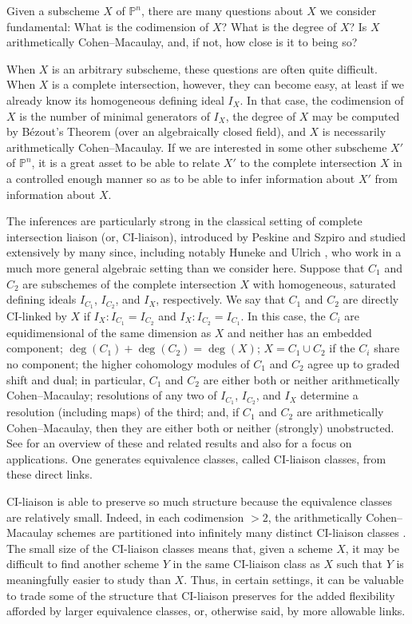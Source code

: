 \documentclass[12pt, reqno]{amsart}
\numberwithin{equation}{section}
\newtheorem{Main Conjecture}[theorem]{Main Conjecture}
\theoremstyle{definition}
\theoremstyle{plain}
\newcommand{\PP}{\mathbb{P}}
\begin{document}
Given a  subscheme  $X$ of $\PP^n$,  there are many questions about $X$ we consider fundamental: What is the codimension of $X$?  What is the degree of $X$?  Is $X$ arithmetically Cohen--Macaulay, and, if not, how close is it to being so?

When $X$ is an arbitrary subscheme, these questions are often quite difficult.  When $X$ is a complete intersection, however, they can become easy, at least if we already know its homogeneous defining ideal $I_X$.  In that case, the codimension of $X$ is the number of minimal generators of $I_X$, the degree of $X$ may be computed by B\'ezout's Theorem (over an algebraically closed field), and $X$ is necessarily arithmetically Cohen--Macaulay.  If we are interested in some other subscheme $X'$ of $\PP^n$, it is a great asset to be able to relate $X'$ to the complete intersection $X$ in a controlled enough manner so as to be able to infer information about $X'$ from information about $X$.  

The inferences are particularly strong in the classical setting of complete intersection liaison (or, CI-liaison), introduced by Peskine and Szpiro \cite{PS74} and studied extensively by many since, including notably Huneke and Ulrich \cite{HU87}, who work in a much more general algebraic setting than we consider here.  Suppose that $C_1$ and $C_2$ are subschemes of the complete intersection $X$ with homogeneous, saturated defining ideals $I_{C_1}$, $I_{C_2}$, and $I_X$, respectively.  We say that $C_1$ and $C_2$ are directly CI-linked by $X$ if $I_X:I_{C_1} = I_{C_2}$ and $I_X:I_{C_2} = I_{C_1}$.  In this case, the $C_i$ are equidimensional of the same dimension as $X$ and neither has an embedded component; $\deg(C_1)+\deg(C_2) = \deg(X)$; $X = C_1 \cup C_2$ if the $C_i$ share no component; the higher cohomology modules of $C_1$ and $C_2$ agree up to graded shift and dual; in particular, $C_1$ and $C_2$ are either both or neither arithmetically Cohen--Macaulay; resolutions of any two of $I_{C_1}$, $I_{C_2}$, and $I_X$ determine a resolution (including maps) of the third; and, if $C_1$ and $C_2$ are arithmetically Cohen--Macaulay, then they are either both or neither (strongly) unobstructed.  See \cite{HU87, KMM+01} for an overview of these and related results and also \cite{MN21} for a focus on applications.   One generates equivalence classes, called CI-liaison classes, from these direct links.  

CI-liaison is able to preserve so much structure because the equivalence classes are relatively small. Indeed, in each codimension $>2$, the arithmetically Cohen--Macaulay schemes are partitioned into infinitely many distinct CI-liaison classes \cite[Corollary 7.10]{KMM+01}. The small size of the CI-liaison classes means that, given a scheme $X$, it may be difficult to find another scheme $Y$ in the same CI-liaison class as $X$ such that $Y$ is meaningfully easier to study than $X$. Thus, in certain settings, it can be valuable to trade some of the structure that CI-liaison preserves for the added flexibility afforded by larger equivalence classes, or, otherwise said, by more allowable links.
\end{document}
